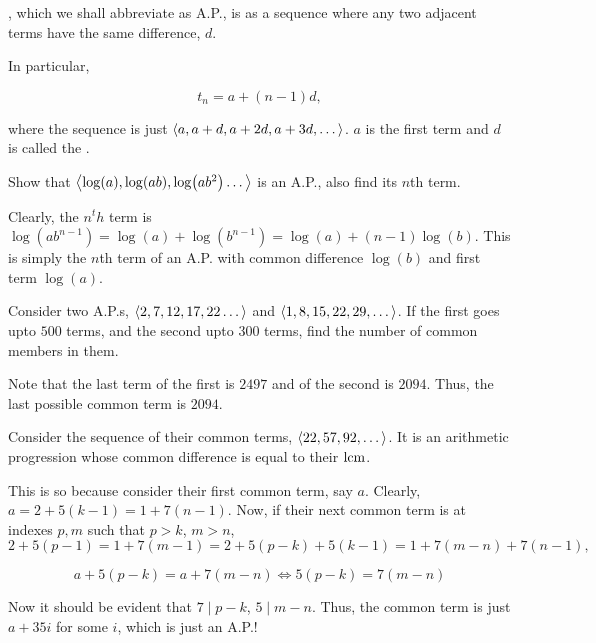 , which we shall abbreviate as A.P., is as a sequence where 
any two adjacent terms have the same difference, \(d\). 

In particular, 

\begin{equation}
    t_n = a + (n-1)d,
\end{equation}

where the sequence is just \(\left\langle a, a+d, a+2d, a+3d, \dots\right\rangle\). \(a\) is the first term 
and \(d\) is called the .

\begin{example}
    Show that \(\left\langle\log(a), \log(ab), \log(ab^2) \dots\right\rangle\) is an A.P., also find its
    \(n\)th term.

    \begin{soln}
        Clearly, the \(n^th\) term is \(\log(ab^{n-1}) = \log(a) + \log(b^{n-1}) = \log(a) + (n-1)\log(b)\).
        This is simply the \(n\)th term of an A.P. with common difference \(\log(b)\) and first 
        term \(\log(a)\).
    \end{soln}
\end{example}

\begin{example}
    Consider two A.P.s, \(\left\langle2, 7, 12, 17, 22 \dots\right\rangle\) and \(\left\langle1, 8, 15, 22, 29, \dots\right\rangle\).
    If the first goes upto \(500\) terms, and the second upto \(300\) terms, find the number of common 
    members in them.

    \begin{soln}
        Note that the last term of the first is \(2497\) and of the second is \(2094\). 
        Thus, the last possible common term is \(2094\). 

        Consider the sequence of their common terms, \(\left\langle22, 57, 92, \dots\right\rangle\). 
        It is an arithmetic progression whose common difference is equal to their \(\operatorname*{lcm}\).

        This is so because consider their first common term, say \(a\). Clearly, 
        \(a = 2 + 5(k-1) = 1 + 7(n-1)\). Now, if their next common term is 
        at indexes \(p, m\) such that \(p > k\), \(m > n\), 
        \[2 + 5(p-1) = 1 + 7(m-1) = 2 + 5(p-k) + 5(k-1) = 1 + 7(m-n) + 7(n-1),\]

        \begin{equation*}
            a + 5(p-k) = a + 7(m-n) \iff 5(p-k) = 7(m-n)
        \end{equation*}

        Now it should be evident that \(7 \mid p-k\), \(5 \mid m-n\). Thus, 
        the common term is just \(a + 35i\) for some \(i\), which is just an A.P.!

    \end{soln}
\end{example}

